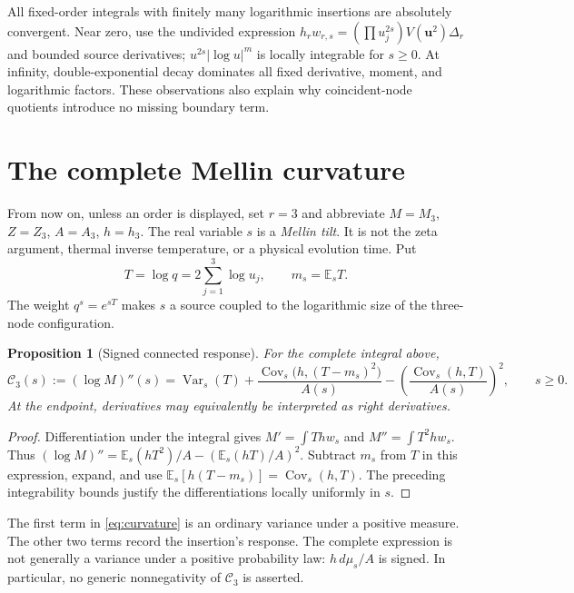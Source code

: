 \documentclass[11pt,letterpaper]{article}
\numberwithin{equation}{section}
\newtheorem{proposition}{Proposition}[section]
\theoremstyle{remark}
\DeclareMathOperator{\Var}{Var}
\DeclareMathOperator{\Cov}{Cov}
\newcommand{\E}{\mathbb E}
\begin{document}
All fixed-order integrals with finitely many logarithmic insertions are
absolutely convergent. Near zero, use the undivided expression
$h_rw_{r,s}=(\prod u_j^{2s})V(\mathbf u^2)\Delta_r$ and bounded source
derivatives; $u^{2s}|\log u|^m$ is locally integrable for $s\ge0$.
At infinity, double-exponential decay dominates all fixed derivative,
moment, and logarithmic factors. These observations also explain why
coincident-node quotients introduce no missing boundary term.

\section{The complete Mellin curvature}
\label{sec:curvature}

From now on, unless an order is displayed, set $r=3$ and abbreviate
$M=M_3$, $Z=Z_3$, $A=A_3$, $h=h_3$. The real variable $s$ is a
\emph{Mellin tilt}. It is not the zeta argument, thermal inverse
temperature, or a physical evolution time. Put
\begin{equation}
 T=\log q=2\sum_{j=1}^3\log u_j,\qquad m_s=\E_sT.
\end{equation}
The weight $q^s=e^{sT}$ makes $s$ a source coupled to the logarithmic
size of the three-node configuration.

\begin{proposition}[Signed connected response]
For the complete integral above,
\begin{equation}
 \mathcal C_3(s):=(\log M)''(s)
 =\Var_s(T)
 +\frac{\Cov_s\bigl(h,(T-m_s)^2\bigr)}{A(s)}
 -\left(\frac{\Cov_s(h,T)}{A(s)}\right)^2,
 \qquad s\ge0. \label{eq:curvature}
\end{equation}
At the endpoint, derivatives may equivalently be interpreted as
right derivatives.
\end{proposition}
\begin{proof}
Differentiation under the integral gives
$M'=\int Thw_s$ and $M''=\int T^2hw_s$.
Thus $(\log M)''=\E_s(hT^2)/A-(\E_s(hT)/A)^2$.
Subtract $m_s$ from $T$ in this expression, expand, and use
$\E_s[h(T-m_s)]=\Cov_s(h,T)$. The preceding integrability bounds
justify the differentiations locally uniformly in $s$.
\end{proof}

The first term in \eqref{eq:curvature} is an ordinary variance under a
positive measure. The other two terms record the insertion's response.
The complete expression is not generally a variance under a positive
probability law: $h\,d\mu_s/A$ is signed. In particular, no generic
nonnegativity of $\mathcal C_3$ is asserted.
\end{document}
